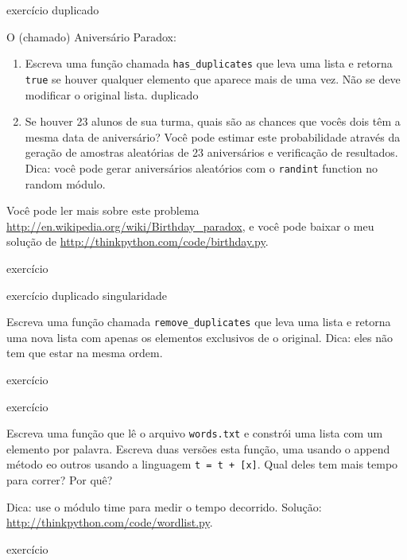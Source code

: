 \documentclass[10pt]{book}
\begin{document}
\begin{} exercício
\label{} duplicado

O (chamado) Aniversário Paradox:

\begin{enumerate}

\item Escreva uma função chamada \verb "has_duplicates" que leva
uma lista e retorna {\tt true} se houver qualquer elemento que
aparece mais de uma vez. Não se deve modificar o original
lista.
\index{} duplicado

\item Se houver 23 alunos de sua turma, quais são as chances
que vocês dois têm a mesma data de aniversário? Você pode estimar este
probabilidade através da geração de amostras aleatórias de 23 aniversários
e verificação de resultados. Dica: você pode gerar aniversários aleatórios
com o {\tt randint} function no {random \tt} módulo.

\end{enumerate}

Você pode ler mais sobre este problema
\url{http://en.wikipedia.org/wiki/Birthday_paradox}, e você pode baixar o meu
solução de \url{http://thinkpython.com/code/birthday.py}.

\end{} exercício


\begin{} exercício
\index{} duplicado
\index{} singularidade

Escreva uma função chamada \verb "remove_duplicates" que leva
uma lista e retorna uma nova lista com apenas os elementos exclusivos de
o original. Dica: eles não tem que estar na mesma ordem.
\end{} exercício


\begin{} exercício

Escreva uma função que lê o arquivo {\tt words.txt} e constrói
uma lista com um elemento por palavra. Escreva duas versões
esta função, uma usando o {\tt} append método eo
outros usando a linguagem {\tt t = t + [x]}. Qual deles tem
mais tempo para correr? Por quê?

Dica: use o módulo {time \tt} para medir o tempo decorrido.
Solução: \url{http://thinkpython.com/code/wordlist.py}.

\end{} exercício
\end{document}
